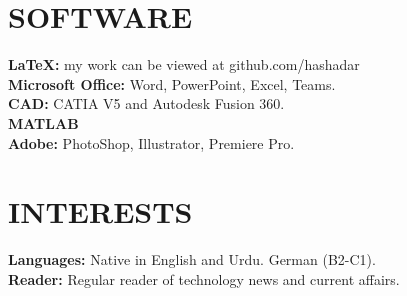 \documentclass[margin, 10pt]{res} %
\begin{document}
\begin{resume}

\section{SOFTWARE}
\textbf{LaTeX:} my work can be viewed at github.com/hashadar\\
\textbf{Microsoft Office:} Word, PowerPoint, Excel, Teams.\\
\textbf{CAD:} CATIA V5 and Autodesk Fusion 360.\\
\textbf{MATLAB}\\
\textbf{Adobe:} PhotoShop, Illustrator, Premiere Pro.


\section{INTERESTS} 
\textbf{Languages:} Native in English and Urdu. German (B2-C1).\\
\textbf{Reader:} Regular reader of technology news and current affairs.



\end{resume}
\end{document}
